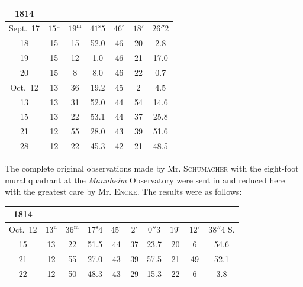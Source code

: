 \begin{center}\fontsize{9}{11}\selectfont\setlength{\tabcolsep}{3pt}\renewcommand{\arraystretch}{1.15}\begin{tabular}{c|ccc|ccc}
1814 &  &  \\
\hline
Sept.\ 17  & $15^{\mathrm u}$ & $19^{\mathrm m}$ & $41^{\mathrm s}5$ & $46^{\circ}$ & $18'$ & $26''2$ \\
18         & 15 & 15 & 52.0 & 46 & 20 & 2.8 \\
19         & 15 & 12 & 1.0  & 46 & 21 & 17.0 \\
20         & 15 & 8  & 8.0  & 46 & 22 & 0.7 \\
Oct.\ 12 & 13 & 36 & 19.2 & 45 & 2  & 4.5 \\
13         & 13 & 31 & 52.0 & 44 & 54 & 14.6 \\
15         & 13 & 22 & 53.1 & 44 & 37 & 25.8 \\
21         & 12 & 55 & 28.0 & 43 & 39 & 51.6 \\
28         & 12 & 22 & 45.3 & 42 & 21 & 48.5 \\
\end{tabular}\end{center}

\par\indent The complete original observations made by Mr. \textsc{Schumacher} with the eight-foot mural quadrant at the \emph{Mannheim} Observatory were sent in and reduced here with the greatest care by Mr. \textsc{Encke}. The results were as follows:

\begin{center}\fontsize{9}{11}\selectfont\setlength{\tabcolsep}{3pt}\renewcommand{\arraystretch}{1.15}\begin{tabular}{c|ccc|ccc|ccc}
1814 &  &  &  \\
\hline
Oct.\ 12 & $13^{\mathrm u}$ & $36^{\mathrm m}$ & $17^{\mathrm s}4$ & $45^{\circ}$ & $2'$  & $0''3$  & $19^{\circ}$ & $12'$ & $38''4$ S. \\
15         & 13 & 22 & 51.5 & 44 & 37 & 23.7 & 20 & 6  & 54.6 \\
21         & 12 & 55 & 27.0 & 43 & 39 & 57.5 & 21 & 49 & 52.1 \\
22         & 12 & 50 & 48.3 & 43 & 29 & 15.3 & 22 & 6  & 3.8  \\
\end{tabular}\end{center}

